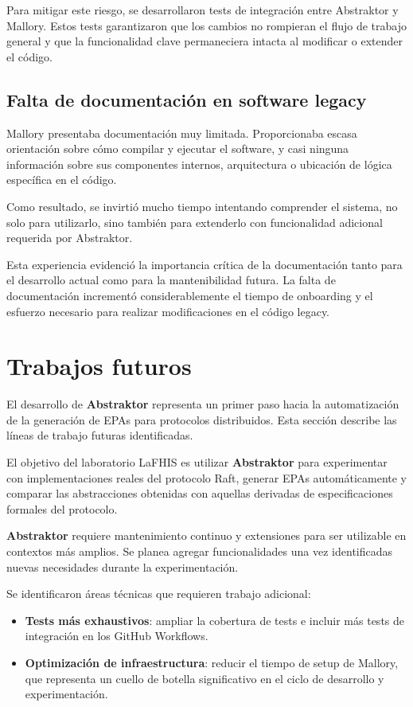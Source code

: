 \documentclass[12pt]{article}
\begin{document}
Para mitigar este riesgo, se desarrollaron tests de integración entre Abstraktor y Mallory. Estos tests garantizaron que los cambios no rompieran el flujo de trabajo general y que la funcionalidad clave permaneciera intacta al modificar o extender el código.

\subsection{Falta de documentación en software legacy}

Mallory presentaba documentación muy limitada. Proporcionaba escasa orientación sobre cómo compilar y ejecutar el software, y casi ninguna información sobre sus componentes internos, arquitectura o ubicación de lógica específica en el código.

Como resultado, se invirtió mucho tiempo intentando comprender el sistema, no solo para utilizarlo, sino también para extenderlo con funcionalidad adicional requerida por Abstraktor. 

Esta experiencia evidenció la importancia crítica de la documentación tanto para el desarrollo actual como para la mantenibilidad futura. La falta de documentación incrementó considerablemente el tiempo de onboarding y el esfuerzo necesario para realizar modificaciones en el código legacy.


\section{Trabajos futuros}

El desarrollo de \textbf{Abstraktor} representa un primer paso hacia la automatización de la generación de EPAs para protocolos distribuidos. Esta sección describe las líneas de trabajo futuras identificadas.

El objetivo del laboratorio LaFHIS es utilizar \textbf{Abstraktor} para experimentar con implementaciones reales del protocolo Raft, generar EPAs automáticamente y comparar las abstracciones obtenidas con aquellas derivadas de especificaciones formales del protocolo.

\textbf{Abstraktor} requiere mantenimiento continuo y extensiones para ser utilizable en contextos más amplios. Se planea agregar funcionalidades una vez identificadas nuevas necesidades durante la experimentación.

Se identificaron áreas técnicas que requieren trabajo adicional:

\begin{itemize}
    \item \textbf{Tests más exhaustivos}: ampliar la cobertura de tests e incluir más tests de integración en los GitHub Workflows.
    
    \item \textbf{Optimización de infraestructura}: reducir el tiempo de setup de Mallory, que representa un cuello de botella significativo en el ciclo de desarrollo y experimentación.
\end{itemize}
\end{document}
